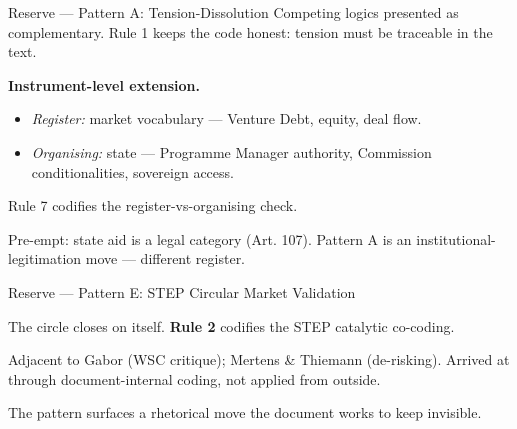 \documentclass[aspectratio=169,hyperref={pdfpagelabels=false}]{beamer}
\begin{document}
\begin{frame}{Reserve — Pattern A: Tension-Dissolution}
    Competing logics presented as complementary. Rule 1 keeps the code honest: tension must be traceable in the text.

    \vspace{3mm}
    \textbf{Instrument-level extension.}
    \begin{itemize}
        \item \emph{Register:} market vocabulary — Venture Debt, equity, deal flow.
        \item \emph{Organising:} state — Programme Manager authority, Commission conditionalities, sovereign access.
    \end{itemize}
    \vspace{2mm}
    Rule 7 codifies the register-vs-organising check.

    \vspace{3mm}
    \footnotesize Pre-empt: state aid is a legal category (Art. 107). Pattern A is an institutional-legitimation move — different register.
\end{frame}

\begin{frame}{Reserve — Pattern E: STEP Circular Market Validation}
    \vspace{2mm}
    \begin{center}
    \end{center}
    \vspace{3mm}
    The circle closes on itself. \textbf{Rule 2} codifies the STEP catalytic co-coding.

    \vspace{3mm}
    Adjacent to Gabor (WSC critique); Mertens \& Thiemann (de-risking). Arrived at through document-internal coding, not applied from outside.

    \vspace{3mm}
    \footnotesize The pattern surfaces a rhetorical move the document works to keep invisible.
\end{frame}
\end{document}
